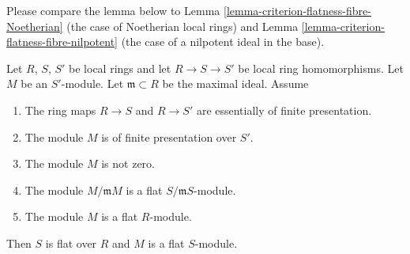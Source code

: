 \noindent
Please compare the lemma below to
Lemma \ref{lemma-criterion-flatness-fibre-Noetherian}
(the case of Noetherian local rings) and
Lemma \ref{lemma-criterion-flatness-fibre-nilpotent}
(the case of a nilpotent ideal in the base).

\begin{lemma}
\label{lemma-criterion-flatness-fibre}
Let $R$, $S$, $S'$ be local rings and let $R \to S \to S'$ be local ring
homomorphisms. Let $M$ be an $S'$-module. Let $\mathfrak m \subset R$
be the maximal ideal. Assume
\begin{enumerate}
\item The ring maps $R \to S$ and $R \to S'$ are essentially
of finite presentation.
\item The module $M$ is of finite presentation over $S'$.
\item The module $M$ is not zero.
\item The module $M/\mathfrak mM$ is a flat $S/\mathfrak mS$-module.
\item The module $M$ is a flat $R$-module.
\end{enumerate}
Then $S$ is flat over $R$ and $M$ is a flat $S$-module.
\end{lemma}

